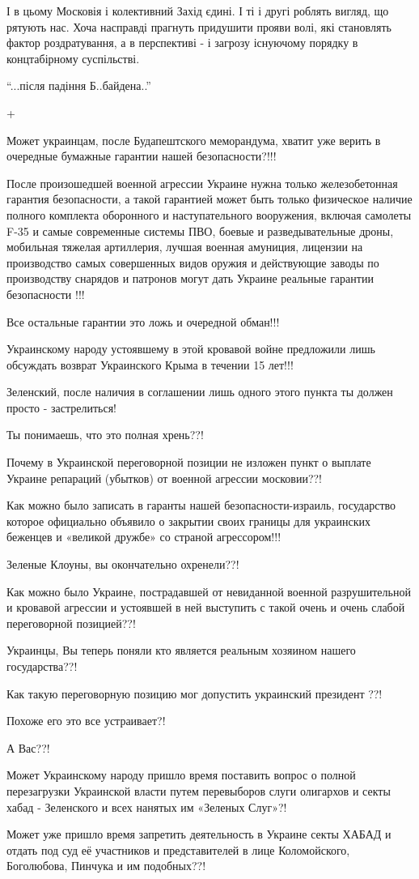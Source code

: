 \begin{itemize}
І в цьому Московія і колективний Захід єдині. І ті і другі роблять вигляд, що
рятують нас. Хоча насправді прагнуть придушити прояви волі, які становлять
фактор роздратування, а в перспективі - і загрозу існуючому порядку в
концтабірному суспільстві.

\enquote{...після падіння Б..байдена..}

+


Может украинцам, после Будапештского меморандума, хватит уже верить в очередные
бумажные гарантии нашей безопасности?!!!

После произошедшей военной агрессии Украине нужна только железобетонная
гарантия безопасности, а такой гарантией может быть только физическое наличие
полного комплекта оборонного и наступательного вооружения, включая самолеты
F-35 и самые современные системы ПВО, боевые и разведывательные дроны,
мобильная тяжелая артиллерия, лучшая военная амуниция, лицензии на производство
самых совершенных видов оружия и действующие заводы по производству снарядов и
патронов могут дать Украине реальные гарантии безопасности !!!

Все остальные гарантии это ложь и очередной обман!!!

Украинскому народу устоявшему в этой кровавой войне предложили лишь обсуждать
возврат Украинского Крыма в течении 15 лет!!!

Зеленский, после наличия в соглашении лишь одного этого пункта ты должен просто
- застрелиться!

Ты понимаешь, что это полная хрень??!

Почему в Украинской переговорной позиции не изложен пункт о выплате Украине
репараций (убытков) от военной агрессии московии??!

Как можно было записать в гаранты нашей безопасности-израиль, государство
которое официально объявило о закрытии своих границы для украинских беженцев и
«великой дружбе» со страной агрессором!!!

Зеленые Клоуны, вы окончательно охренели??!

Как можно было Украине, пострадавшей от невиданной военной разрушительной и
кровавой агрессии и устоявшей в ней выступить с такой очень и очень слабой
переговорной позицией??!

Украинцы, Вы теперь поняли кто является реальным хозяином нашего государства??!

Как такую переговорную позицию мог допустить украинский президент ??!

Похоже его это все устраивает?!

А Вас??!

Может Украинскому народу пришло время поставить вопрос о полной перезагрузки
Украинской власти путем перевыборов слуги олигархов и секты хабад - Зеленского
и всех нанятых им «Зеленых Слуг»?!

Может уже пришло время запретить деятельность в Украине секты ХАБАД и отдать
под суд её участников и представителей в лице Коломойского, Боголюбова, Пинчука
и им подобных??!

\end{itemize} %
